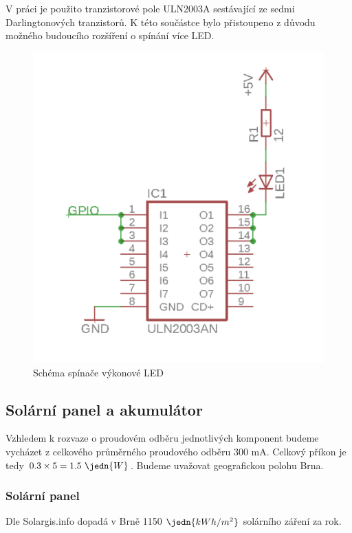 V práci je použito tranzistorové pole ULN2003A sestávající ze sedmi Darlingtonových tranzistorů. K této součástce bylo přistoupeno z důvodu možného budoucího rozšíření o spínání více LED.  

\begin{figure}[h!]
  \begin{center}
    \includegraphics[scale=0.5]{obrazky/schema_switch2.png}
  \end{center}
  \caption{Schéma spínače výkonové LED}
\end{figure}


\subsection*{Solární panel a akumulátor}
Vzhledem k rozvaze o proudovém odběru jednotlivých komponent budeme vycházet z celkového průměrného proudového odběru 300 mA. Celkový příkon je tedy $0.3\times5 = 1.5 \ \jedn{W}$. Budeme uvažovat geografickou polohu Brna.

\subsubsection{Solární panel}
Dle Solargis.info dopadá v Brně 1150 $\jedn{kWh/m^2}$ solárního záření za rok.

